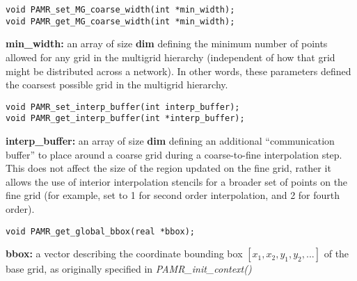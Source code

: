 \documentclass[aps,amssymb,unsortedaddress,nofootinbib]{revtex4}
\def\lsep{\itemsep 0.05in}
\begin{document}

\begin{verbatim}
void PAMR_set_MG_coarse_width(int *min_width);
void PAMR_get_MG_coarse_width(int *min_width);
\end{verbatim}
\begin{list}{}{\lsep}
\item {\bf *min\_width:} an array of size {\bf dim} defining the minimum number of points allowed
                      for any grid in the multigrid hierarchy
                      (independent of how that grid might be distributed across a network).
                      In other words, these parameters defined the coarsest possible grid in the
                      multigrid hierarchy.
\end{list}


\begin{verbatim}
void PAMR_set_interp_buffer(int interp_buffer);
void PAMR_get_interp_buffer(int *interp_buffer);
\end{verbatim}
\begin{list}{}{\lsep}
\item {\bf *interp\_buffer:} an array of size {\bf dim} defining an additional ``communication buffer''
                      to place around a coarse grid during a coarse-to-fine interpolation step.
                      This does not affect the size of the region updated on the fine grid,
                      rather it allows the use of interior interpolation stencils for a broader
                      set of points on the fine grid (for example, set to 1 for second order interpolation,
                      and 2 for fourth order).
\end{list}


\begin{verbatim}
void PAMR_get_global_bbox(real *bbox);
\end{verbatim}
\begin{list}{}{\lsep}
\item {\bf *bbox:} a vector describing the coordinate bounding box $[x_1,x_2,y_1,y_2,...]$ of the base grid,
                   as originally specified in {\em PAMR\_init\_context()}
\end{list}
\end{document}
